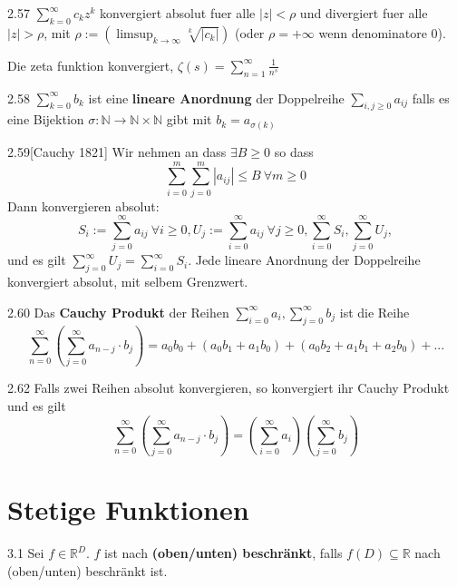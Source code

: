 \documentclass[8pt,a4paper,twocolumn,table]{extarticle}
\newcommand{\N}{\mathbb{N}}
\newcommand{\R}{\mathbb{R}}
\begin{document}
\begin{korollar}{2.57}
    $\sum_{k=0}^\infty c_k z^k$ konvergiert absolut fuer alle $|z| < \rho$ und divergiert fuer alle $|z| > \rho$,
    mit $\rho := \left( \limsup_{k \to \infty} \sqrt[k]{|c_k|} \right)$ (oder $\rho = +\infty$ wenn denominatore 0).
\end{korollar}

\begin{korollar}{}
    Die zeta funktion konvergiert, $\zeta(s) = \sum_{n=1}^\infty \frac{1}{n^s}$
\end{korollar}

\begin{definition}{2.58}
    $\sum_{k=0}^\infty b_k$ ist eine \textbf{lineare Anordnung} der Doppelreihe $\sum_{i,j \ge 0} a_{ij}$ falls es
    eine Bijektion $\sigma : \N \to \N \times \N$ gibt mit $b_k = a_{\sigma(k)}$
\end{definition}

\begin{satz}{2.59}[Cauchy 1821]
    Wir nehmen an dass $\exists B \ge 0$ so dass
    \[ \sum_{i=0}^m \sum_{j=0}^m |a_{ij}| \le B\ \forall m \ge 0 \]
    Dann konvergieren absolut:
    \[
        S_i := \sum_{j=0}^\infty a_{ij}\ \forall i \ge 0,
        U_j := \sum_{i=0}^\infty a_{ij}\ \forall j \ge 0,
        \sum_{i=0}^\infty S_i,
        \sum_{j=0}^\infty U_j,
    \]
    und es gilt $\sum_{j=0}^\infty U_j = \sum_{i=0}^\infty S_i$.
    Jede lineare Anordnung der Doppelreihe konvergiert absolut, mit selbem Grenzwert.
\end{satz}

\begin{definition}{2.60}
    Das \textbf{Cauchy Produkt} der Reihen $\sum_{i=0}^\infty a_i, \sum_{j=0}^\infty b_j$
    ist die Reihe
    \[ \sum_{n=0}^\infty \left( \sum_{j=0}^\infty a_{n-j} \cdot b_j \right) = a_0b_0 + (a_0b_1 + a_1b_0) + (a_0b_2 + a_1b_1 + a_2b_0) + ... \]
\end{definition}
\begin{satz}{2.62}
    Falls zwei Reihen absolut konvergieren, so konvergiert ihr Cauchy Produkt und es gilt
    \[ \sum_{n=0}^\infty \left( \sum_{j=0}^\infty a_{n-j} \cdot b_j \right) = \left( \sum_{i=0}^\infty a_i \right) \left( \sum_{j=0}^\infty b_j \right)\]
\end{satz}

\section{Stetige Funktionen}
\begin{definition}{3.1}
    Sei $f \in \R^D$.
    $f$ ist nach \textbf{(oben/unten) beschränkt}, falls $f(D) \subseteq \R$ nach (oben/unten) beschränkt ist.
\end{definition}
\end{document}
